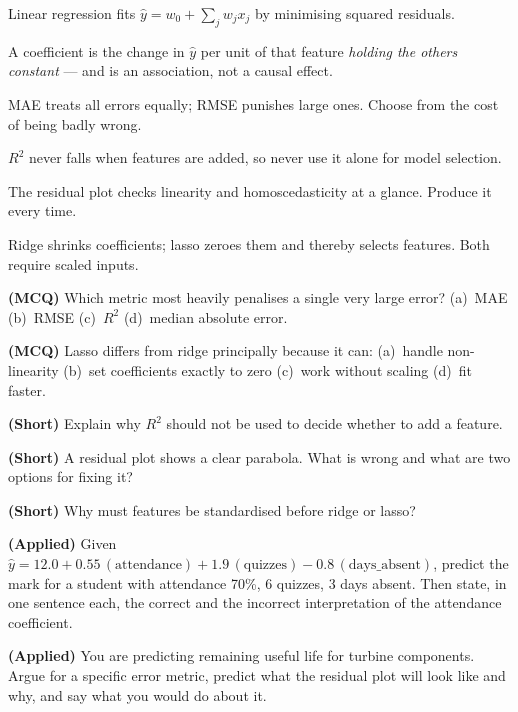 \begin{chaptersummary}
\begin{tight}
  \item Linear regression fits $\hat{y} = w_0 + \sum_j w_j x_j$ by minimising
        squared residuals.
  \item A coefficient is the change in $\hat{y}$ per unit of that feature
        \emph{holding the others constant} --- and is an association, not a causal
        effect.
  \item MAE treats all errors equally; RMSE punishes large ones. Choose from the
        cost of being badly wrong.
  \item $R^2$ never falls when features are added, so never use it alone for model
        selection.
  \item The residual plot checks linearity and homoscedasticity at a glance.
        Produce it every time.
  \item Ridge shrinks coefficients; lasso zeroes them and thereby selects features.
        Both require scaled inputs.
\end{tight}
\end{chaptersummary}

\begin{reviewq}
  \item \textbf{(MCQ)} Which metric most heavily penalises a single very large
        error? (a)~MAE (b)~RMSE (c)~$R^2$ (d)~median absolute error.
  \item \textbf{(MCQ)} Lasso differs from ridge principally because it can:
        (a)~handle non-linearity (b)~set coefficients exactly to zero
        (c)~work without scaling (d)~fit faster.
  \item \textbf{(Short)} Explain why $R^2$ should not be used to decide whether to
        add a feature.
  \item \textbf{(Short)} A residual plot shows a clear parabola. What is wrong and
        what are two options for fixing it?
  \item \textbf{(Short)} Why must features be standardised before ridge or lasso?
  \item \textbf{(Applied)} Given $\hat{y} = 12.0 + 0.55\,(\text{attendance}) +
        1.9\,(\text{quizzes}) - 0.8\,(\text{days\_absent})$, predict the mark for a
        student with attendance 70\%, 6 quizzes, 3 days absent. Then state, in one
        sentence each, the correct and the incorrect interpretation of the
        attendance coefficient.
  \item \textbf{(Applied)} You are predicting remaining useful life for turbine
        components. Argue for a specific error metric, predict what the residual
        plot will look like and why, and say what you would do about it.
\end{reviewq}
